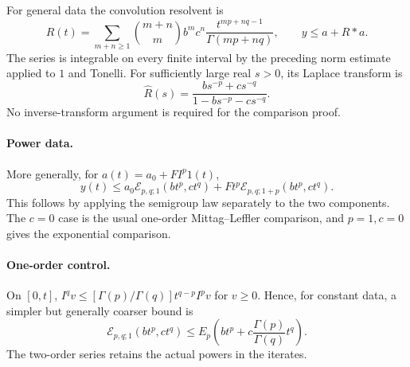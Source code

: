 \documentclass[11pt,a4paper]{article}
\newcommand{\ML}{\mathcal E}
\begin{document}
For general data the convolution resolvent is
\[
 R(t)=\sum_{m+n\ge1}\binom{m+n}{m}b^m c^n\frac{t^{mp+nq-1}}{\Gamma(mp+nq)},\qquad y\le a+R*a.
\]
The series is integrable on every finite interval by the preceding norm estimate applied to $1$ and Tonelli. For sufficiently large real $s>0$, its Laplace transform is
\[
 \widehat R(s)=\frac{bs^{-p}+cs^{-q}}{1-bs^{-p}-cs^{-q}}.
\]
No inverse-transform argument is required for the comparison proof.
\paragraph{Power data.} More generally, for $a(t)=a_0+F I^p1(t)$,
\[
 y(t)\le a_0\ML_{p,q;1}(bt^p,ct^q)
 +Ft^p\ML_{p,q;1+p}(bt^p,ct^q).
\]
This follows by applying the semigroup law separately to the two components. The $c=0$ case is the usual one-order Mittag--Leffler comparison, and $p=1,c=0$ gives the exponential comparison.
\paragraph{One-order control.} On $[0,t]$, $I^q v\le [\Gamma(p)/\Gamma(q)]t^{q-p}I^p v$ for $v\ge0$. Hence, for constant data, a simpler but generally coarser bound is
\[
 \ML_{p,q;1}(bt^p,ct^q)\le E_p\left(bt^p+c\frac{\Gamma(p)}{\Gamma(q)}t^q\right).
\]
The two-order series retains the actual powers in the iterates.
\end{document}
